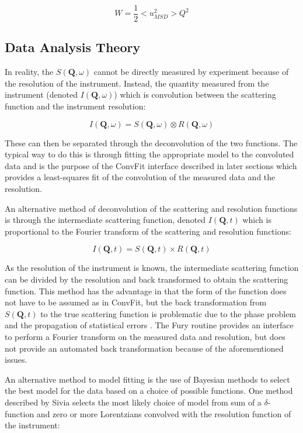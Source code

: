 \documentclass[paper=a4, fontsize=11pt]{scrartcl}	%
\numberwithin{equation}{section}															%
\numberwithin{figure}{section}																%
\numberwithin{table}{section}																%
\begin{document}
\begin{equation}
W = \frac{1}{2} < u^2_{MSD} > Q^2
\end{equation}

\subsection{Data Analysis Theory}
In reality, the $S(\mathbf{Q}, \omega)$ cannot be directly measured by experiment because of the resolution of the instrument. Instead, the quantity measured from the instrument (denoted $I(\mathbf{Q}, \omega)$) which is convolution between the scattering function and the instrument resolution:

\begin{equation}
I(\mathbf{Q}, \omega) = S(\mathbf{Q}, \omega) \otimes R(\mathbf{Q}, \omega)
\end{equation}

These can then be separated through the deconvolution of the two functions. The typical way to do this is through fitting the appropriate model to the convoluted data and is the purpose of the ConvFit interface described in later sections which provides a least-squares fit of the convolution of  the measured data and the resolution.

An alternative method of deconvolution of the scattering and resolution functions is through the intermediate scattering function, denoted $I(\mathbf{Q}, t)$ which is proportional to the Fourier transform of the scattering and resolution functions:

\begin{equation}
I(\mathbf{Q}, t) = S(\mathbf{Q}, t) \times R(\mathbf{Q}, t)
\end{equation}

As the resolution of the instrument is known, the intermediate scattering function can be divided by the resolution and back transformed to obtain the scattering function. This method has the advantage in that the form of the function does not have to be assumed as in ConvFit, but the back transformation from $S(\mathbf{Q}, t)$ to the true scattering function is problematic due to the phase problem \cite{dssivia2011} and the propagation of statistical errors \cite{}. The Fury routine provides an interface to perform a Fourier transform on the measured data and resolution, but does not provide an automated back transformation because of the aforementioned issues.

An alternative method to model fitting is the use of Bayesian methods to select the best model for the data based on a choice of possible functions. One method described by Sivia \cite{dssivia1992} selects the most likely choice of model from sum of a $\delta$-function and zero or more Lorentzians convolved with the resolution function of the instrument: 
\end{document}
